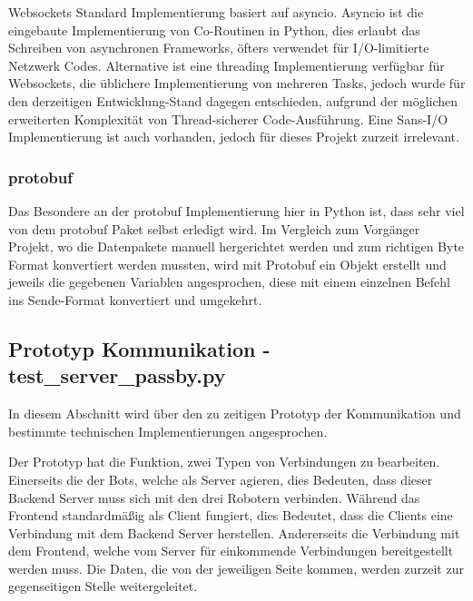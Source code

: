 Websockets Standard Implementierung basiert auf asyncio.
%  
Asyncio ist die eingebaute Implementierung von Co-Routinen in Python,
dies erlaubt das Schreiben von asynchronen Frameworks, 
öfters verwendet für I/O-limitierte Netzwerk Codes.
Alternative ist eine threading Implementierung verfügbar für Websockets, 
die üblichere Implementierung von mehreren Tasks, 
jedoch wurde für den derzeitigen Entwicklung-Stand dagegen entschieden,
aufgrund der möglichen erweiterten Komplexität von Thread-sicherer Code-Ausführung.
Eine Sans-I/O Implementierung ist auch vorhanden, 
jedoch für dieses Projekt zurzeit irrelevant.

\subsubsection{protobuf}
Das Besondere an der protobuf Implementierung hier in Python ist,
dass sehr viel von dem protobuf Paket selbst erledigt wird.
Im Vergleich zum Vorgänger Projekt, wo die Datenpakete manuell hergerichtet werden
und zum richtigen Byte Format konvertiert werden mussten, 
wird mit Protobuf ein Objekt erstellt 
und jeweils die gegebenen Variablen angesprochen, 
diese mit einem einzelnen Befehl ins Sende-Format konvertiert und umgekehrt.


\subsection{Prototyp Kommunikation - test\_server\_passby.py}
In diesem Abschnitt wird über den zu zeitigen Prototyp der Kommunikation 
und bestimmte technischen Implementierungen angesprochen.

Der Prototyp hat die Funktion, zwei Typen von Verbindungen zu bearbeiten.
% 
Einerseits die der Bots, welche als Server agieren, 
dies Bedeuten, dass dieser Backend Server muss sich mit den drei Robotern verbinden.
Während das Frontend standardmäßig als Client fungiert, 
dies Bedeutet, dass die Clients eine Verbindung mit dem Backend Server herstellen.
% 
Andererseits die Verbindung mit dem Frontend, 
welche vom Server für einkommende Verbindungen bereitgestellt werden muss.
% 
Die Daten, die von der jeweiligen Seite kommen, 
werden zurzeit zur gegenseitigen Stelle weitergeleitet.

